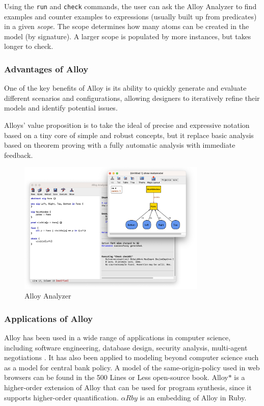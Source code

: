 Using the \verb|run| and \verb|check| commands, the user can ask the Alloy Analyzer to find examples and counter examples to expressions (usually built up from predicates) in a given \textit{scope}. The scope determines how many atoms can be created in the model (by signature). A larger scope is populated by more instances, but takes longer to check.

\subsubsection{Advantages of Alloy}

One of the key benefits of Alloy is its ability to quickly generate and evaluate different scenarios and configurations, allowing designers to iteratively refine their models and identify potential issues.

Alloys' value proposition is to take the ideal of precise and expressive notation based on a tiny core of simple and robust concepts, but it replace basic analysis based on theorem proving with a fully automatic analysis with immediate feedback.\cite{DJSALLA}

\begin{figure}
\centering
\includegraphics[width=0.8\textwidth]{pics/alloy-analyzer.png}
\caption{Alloy Analyzer}\label{fig:alloy-analyzer}
\end{figure}

\subsubsection{Applications of Alloy}

Alloy has been used in a wide range of applications in computer science, including software engineering, database design, security analysis\cite{Carpio2021}\cite{Chen2006}, multi-agent negotiations \cite{Podorozhny}. It has also been applied to modeling beyond computer science such as a model for central bank policy\cite{Johnson2021}. A model of the same-origin-policy used in web browsers can be found in the 500 Lines or Less open-source book\cite{500Lines19:online}. Alloy$\ast$ is a higher-order extension of Alloy that can be used for program synthesis, since it supports higher-order quantification\cite{Milicevic2017}. $\alpha{Rb}y$ is an embedding of Alloy in Ruby\cite{Arby}.


